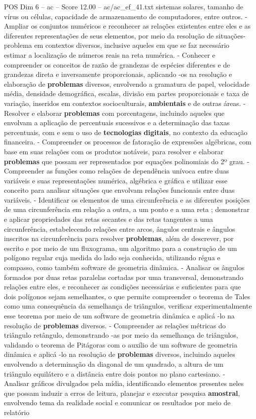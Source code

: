 \begin{textsample}{POS Dim 6 – ac – Score 12.00 – ac/ac\_ef\_41.txt}
sistemas solares, tamanho de vírus ou células, capacidade de armazenamento de computadores, entre outros. - Ampliar os conjuntos numéricos e reconhecer as relações existentes entre eles e as diferentes representações de seus elementos, por meio da resolução de situações-problema em contextos diversos, inclusive aqueles em que se faz necessário estimar a localização de números reais na reta numérica. - Conhecer e compreender os conceitos de razão de grandezas de espécies diferentes e de grandezas direta e inversamente proporcionais, aplicando -os na resolução e elaboração de \textbf{problemas} diversos, envolvendo a gramatura de papel, velocidade média, densidade demográfica, escalas, divisão em partes proporcionais e taxa de variação, inseridos em contextos socioculturais, \textbf{ambientais} e de outras áreas. - Resolver e elaborar \textbf{problemas} com porcentagens, incluindo aqueles que envolvam a aplicação de percentuais sucessivos e a determinação das taxas percentuais, com e sem o uso de \textbf{tecnologias} \textbf{digitais}, no contexto da educação financeira. - Compreender os processos de fatoração de expressões algébricas, com base em suas relações com os produtos notáveis, para resolver e elaborar \textbf{problemas} que possam ser representados por equações polinomiais do 2º grau. - Compreender as funções como relações de dependência unívoca entre duas variáveis e suas representações numérica, algébrica e gráfica e utilizar esse conceito para analisar situações que envolvam relações funcionais entre duas variáveis. - Identificar os elementos de uma circunferência e as diferentes posições de uma circunferência em relação a outra, a um ponto e a uma reta ; demonstrar e aplicar propriedades das retas secantes e das retas tangentes a uma circunferência, estabelecendo relações entre arcos, ângulos centrais e ângulos inscritos na circunferência para resolver \textbf{problemas}, além de descrever, por escrito e por meio de um fluxograma, um algoritmo para a construção de um polígono regular cuja medida do lado seja conhecida, utilizando régua e compasso, como também software de geometria dinâmica. - Analisar os ângulos formados por duas retas paralelas cortadas por uma transversal, demonstrando relações entre eles, e reconhecer as condições necessárias e suficientes para que dois polígonos sejam semelhantes, o que permite compreender o teorema de Tales como uma consequência da semelhança de triângulos, verificar experimentalmente esse teorema por meio de um software de geometria dinâmica e aplicá -lo na resolução de \textbf{problemas} diversos. - Compreender as relações métricas do triângulo retângulo, demonstrando -as por meio da semelhança de triângulos, validando o teorema de Pitágoras com o auxílio de um software de geometria dinâmica e aplicá -lo na resolução de \textbf{problemas} diversos, incluindo aqueles envolvendo a determinação da diagonal de um quadrado, a altura de um triângulo equilátero e a distância entre dois pontos no plano cartesiano. - Analisar gráficos divulgados pela mídia, identificando elementos presentes neles que possam induzir a erros de leitura, planejar e executar pesquisa \textbf{amostral}, envolvendo tema da realidade social e comunicar os resultados por meio de relatório 
\end{textsample}
